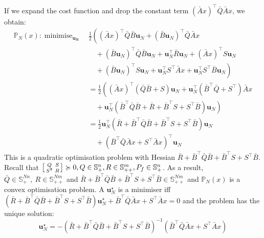\documentclass[a4paper,11pt,reqno]{amsart}
\newcommand{\tran}{\intercal}
\DeclareMathOperator*{\minimise}{minimise}
\newcommand{\smallplus}{{\scriptscriptstyle +}}
\newcommand{\Spp}{\mathbb{S}_{\smallplus\smallplus}}
\newcommand{\Sp}{\mathbb{S}_{\smallplus}}
\begin{document}
If we expand the cost function and drop the constant term $(\bar{A}x)^{\tran}\bar{Q}\bar{A}x$, we obtain:
\begin{subequations}
    \begin{align}
        \mathbb{P}_N(x): \minimise_{\bm{u_N}} \,
        &\tfrac{1}{2}\left((\bar{A}x)^{\tran}\bar{Q}\bar{B}\bm{u}_N+(\bar{B}\bm{u}_N)^{\tran}\bar{Q}\bar{A}x\right.
        \\
        &\quad+(\bar{B}\bm{u}_N)^{\tran}\bar{Q}\bar{B}\bm{u}_N+\bm{u}_N^{\tran}\bar{R}\bm{u}_N+(\bar{A}x)^{\tran}S\bm{u}_N 
        \\
        &\left.\quad+(\bar{B}\bm{u}_N)^{\tran}S\bm{u}_N+\bm{u}_N^{\tran}S^{\tran}\bar{A}x+\bm{u}_N^{\tran}S^{\tran}\bar{B}\bm{u}_N \right) 
        \\
        &=\tfrac{1}{2}\left( (\bar{A}x)^{\tran}(\bar{Q}\bar{B}+S)\bm{u}_N+\bm{u}_N^{\tran}(\bar{B}^{\tran}\bar{Q}+S^{\tran})\bar{A}x\right.
        \\
        &\left.\quad+\bm{u}_N^{\tran}(\bar{B}^{\tran}\bar{Q}\bar{B}+\bar{R}+\bar{B}^{\tran}S+S^{\tran}\bar{B})\bm{u}_N \right)
        \\
        &=\tfrac{1}{2}\bm{u}_N^{\tran}(\bar{R}+\bar{B}^{\tran}\bar{Q}\bar{B}+\bar{B}^{\tran}S+S^{\tran}\bar{B})\bm{u}_N
        \\
        &\quad+(\bar{B}^{\tran}\bar{Q}\bar{A}x+S^{\tran}\bar{A}x)^{\tran}\bm{u}_N
    \end{align}
\end{subequations}
This is a quadratic optimisation problem with Hessian
$\bar{R}+\bar{B}^{\tran}\bar{Q}\bar{B}+\bar{B}^{\tran}S+S^{\tran}\bar{B}$.
Recall that $\begin{bsmallmatrix}Q&S\\S^{\tran}&R\end{bsmallmatrix}\succcurlyeq 0, Q\in \mathbb{S}^n_+, R\in \mathbb{S}^m_{++}, P_f\in \mathbb{S}^n_{+}$.
As a result, $\bar{Q}\in\Sp^{Nn},\ R\in\Spp^{Nm}$ and
$\bar{R}+\bar{B}^{\tran}\bar{Q}\bar{B}+\bar{B}^{\tran}S+S^{\tran}\bar{B}\in\Spp^{Nm}$
and $\mathbb{P}_N(x)$ is a convex optimisation problem.
A $\bm{u}_N^{\star}$ is a minimiser iff
$(\bar{R}+\bar{B}^{\tran}\bar{Q}\bar{B}+\bar{B}^{\tran}S+S^{\tran}\bar{B})\bm{u}_N^{\star}+\bar{B}^{\tran}\bar{Q}\bar{A}x+S^{\tran}\bar{A}x=0$
and the problem has the unique solution:
\begin{equation}
    \bm{u}_N^{\star}=-(\bar{R}+\bar{B}^{\tran}\bar{Q}\bar{B}+\bar{B}^{\tran}S+S^{\tran}\bar{B})^{-1}(\bar{B}^{\tran}\bar{Q}\bar{A}x+S^{\tran}\bar{A}x)
\end{equation}
\end{document}
